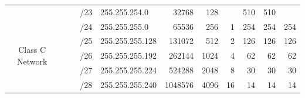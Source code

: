 \documentclass[11pt,a4paper]{article}
\begin{document}
\begin{table}[]
\begin{tabular}{ccccl|r|r|r|r|r|r|}
\multicolumn{1}{c|}{}                                  & \multicolumn{1}{c|}{}                                  & \multicolumn{1}{c|}{}                                  & \multicolumn{1}{c|}{/23} & 255.255.254.0                & 32768                        & 128                          &                              & 510                          & 510                          &                              \\ \cline{1-1} \cline{4-11} 
\multicolumn{1}{|c|}{\multirow{7}{*}{\begin{sideways}Class C Network\end{sideways}}} & \multicolumn{1}{c|}{}                                  & \multicolumn{1}{c|}{}                                  & \multicolumn{1}{c|}{/24} & 255.255.255.0                & 65536                        & 256                          & 1                            & 254                          & 254                          & 254                          \\ \cline{4-11} 
\multicolumn{1}{|c|}{}                                 & \multicolumn{1}{c|}{}                                  & \multicolumn{1}{c|}{}                                  & \multicolumn{1}{c|}{/25} & 255.255.255.128              & 131072                       & 512                          & 2                            & 126                          & 126                          & 126                          \\ \cline{4-11} 
\multicolumn{1}{|c|}{}                                 & \multicolumn{1}{c|}{}                                  & \multicolumn{1}{c|}{}                                  & \multicolumn{1}{c|}{/26} & 255.255.255.192              & 262144                       & 1024                         & 4                            & 62                           & 62                           & 62                           \\ \cline{4-11} 
\multicolumn{1}{|c|}{}                                 & \multicolumn{1}{c|}{}                                  & \multicolumn{1}{c|}{}                                  & \multicolumn{1}{c|}{/27} & 255.255.255.224              & 524288                       & 2048                         & 8                            & 30                           & 30                           & 30                           \\ \cline{4-11} 
\multicolumn{1}{|c|}{}                                 & \multicolumn{1}{c|}{}                                  & \multicolumn{1}{c|}{}                                  & \multicolumn{1}{c|}{/28} & 255.255.255.240              & 1048576                      & 4096                         & 16                           & 14                           & 14                           & 14                           \\ \cline{4-11} 

\end{tabular}
\end{table}
\end{document}
